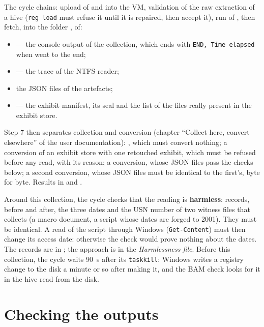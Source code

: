 \documentclass[11pt,a4paper,oneside]{report}
\begin{document}
The cycle chains: upload of  and 
into the VM, validation of the raw extraction of a hive (\texttt{reg load} must
refuse it until it is repaired, then accept it), run of \wac{}, then fetch, into
the folder , of:

\begin{itemize}
  \item {} — the console output of the collection, which ends
    with \texttt{END, Time elapsed} when \wac{} went to the end;
  \item {} — the trace of the NTFS reader;
  \item the JSON files of the artefacts;
  \item {} — the exhibit manifest, its seal and the list of
    the files really present in the exhibit store.
\end{itemize}

Step 7 then separates collection and conversion (chapter ``Collect here,
convert elsewhere'' of the user documentation):  
, which must convert nothing; a conversion of an exhibit store with
one retouched exhibit, which must be refused before any read, with its reason;
a conversion, whose JSON files pass the checks below; a second conversion,
whose JSON files must be identical to the first's, byte for byte. Results in
 and .

Around this collection, the cycle checks that the reading is
\textbf{harmless}:  records, before and after,
the three dates and the USN number of two witness files that 
collects (a macro document, a script whose dates are forged to 2001). They must
be identical. A read of the script through Windows (\texttt{Get-Content}) must
then change its access date: otherwise the check would prove nothing about the
dates. The records are in ; the approach is in the
\emph{Harmlessness file}. Before this collection, the cycle waits 90~s after
its \texttt{taskkill}: Windows writes a registry change to the disk a minute or
so after making it, and the BAM check looks for it in the hive read from the
disk.

\section{Checking the outputs}
\end{document}
